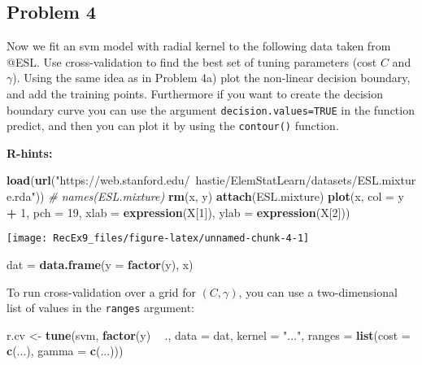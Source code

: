 \documentclass[]{article}
\newenvironment{Shaded}{\begin{snugshade}}{\end{snugshade}}
\newcommand{\CommentTok}[1]{\textcolor[rgb]{0.56,0.35,0.01}{\textit{#1}}}
\newcommand{\DataTypeTok}[1]{\textcolor[rgb]{0.13,0.29,0.53}{#1}}
\newcommand{\DecValTok}[1]{\textcolor[rgb]{0.00,0.00,0.81}{#1}}
\newcommand{\KeywordTok}[1]{\textcolor[rgb]{0.13,0.29,0.53}{\textbf{#1}}}
\newcommand{\NormalTok}[1]{#1}
\newcommand{\OperatorTok}[1]{\textcolor[rgb]{0.81,0.36,0.00}{\textbf{#1}}}
\newcommand{\StringTok}[1]{\textcolor[rgb]{0.31,0.60,0.02}{#1}}
\begin{document}
\hypertarget{problem-4}{%
\subsection{Problem 4}\label{problem-4}}

Now we fit an svm model with radial kernel to the following data taken
from @ESL. Use cross-validation to find the best set of tuning
parameters (cost \(C\) and \(\gamma\)). Using the same idea as in
Problem 4a) plot the non-linear decision boundary, and add the training
points. Furthermore if you want to create the decision boundary curve
you can use the argument \texttt{decision.values=TRUE} in the function
predict, and then you can plot it by using the \texttt{contour()}
function.

\textbf{R-hints:}

\begin{Shaded}
\begin{Highlighting}[]
\KeywordTok{load}\NormalTok{(}\KeywordTok{url}\NormalTok{(}\StringTok{"https://web.stanford.edu/~hastie/ElemStatLearn/datasets/ESL.mixture.rda"}\NormalTok{))}
\CommentTok{# names(ESL.mixture)}
\KeywordTok{rm}\NormalTok{(x, y)}
\KeywordTok{attach}\NormalTok{(ESL.mixture)}
\KeywordTok{plot}\NormalTok{(x, }\DataTypeTok{col =}\NormalTok{ y }\OperatorTok{+}\StringTok{ }\DecValTok{1}\NormalTok{, }\DataTypeTok{pch =} \DecValTok{19}\NormalTok{, }\DataTypeTok{xlab =} \KeywordTok{expression}\NormalTok{(X[}\DecValTok{1}\NormalTok{]), }\DataTypeTok{ylab =} \KeywordTok{expression}\NormalTok{(X[}\DecValTok{2}\NormalTok{]))}
\end{Highlighting}
\end{Shaded}

\texttt{[image: RecEx9\_files/figure-latex/unnamed-chunk-4-1]}

\begin{Shaded}
\begin{Highlighting}[]
\NormalTok{dat =}\StringTok{ }\KeywordTok{data.frame}\NormalTok{(}\DataTypeTok{y =} \KeywordTok{factor}\NormalTok{(y), x)}
\end{Highlighting}
\end{Shaded}

To run cross-validation over a grid for \((C,\gamma)\), you can use a
two-dimensional list of values in the \texttt{ranges} argument:

\begin{Shaded}
\begin{Highlighting}[]
\NormalTok{r.cv <-}\StringTok{ }\KeywordTok{tune}\NormalTok{(svm, }\KeywordTok{factor}\NormalTok{(y) }\OperatorTok{~}\StringTok{ }\NormalTok{., }\DataTypeTok{data =}\NormalTok{ dat, }\DataTypeTok{kernel =} \StringTok{"..."}\NormalTok{, }\DataTypeTok{ranges =} \KeywordTok{list}\NormalTok{(}\DataTypeTok{cost =} \KeywordTok{c}\NormalTok{(...), }
    \DataTypeTok{gamma =} \KeywordTok{c}\NormalTok{(...)))}
\end{Highlighting}
\end{Shaded}
\end{document}
